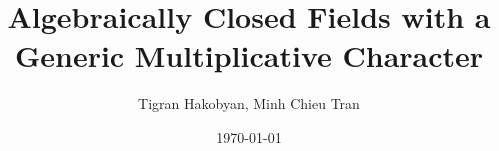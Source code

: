 \documentclass[reqno]{amsart}
\begin{document}
\sloppy


\title[Algebraically Closed Fields with a Character]{Algebraically Closed Fields with a Generic Multiplicative Character}
\author{Tigran Hakobyan, Minh Chieu Tran}



\address{Department of Mathematics\\
University of Illinois at Urbana-Cham\-paign\\
Urbana, IL 61801\\
U.S.A.}

\address{Department of Mathematics, University of Illinois at Urbana-
Champaign, Urbana, IL 61801, U.S.A.}
\curraddr{}
\date{\today}
\maketitle
\begin{comment}
s, t, u, v ----> F

|  |  |  |  
|  |  |  |
v  v  v  v  

w, x, y, z ----> K

k, n, m, l ----> sizes
\end{comment}

%












\begin{comment}

\end{comment}






%



\end{document}
